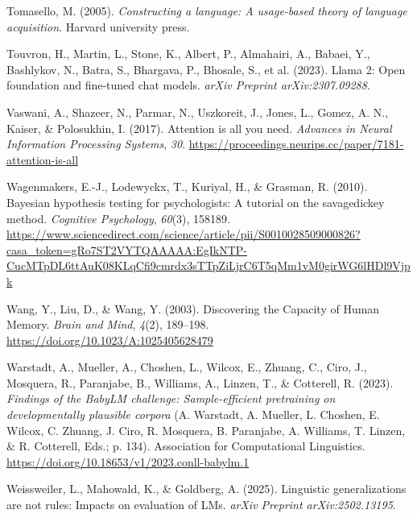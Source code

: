 \documentclass[
  12pt,
  letterpaper,
]{scrreport}
\newlength{\cslhangindent}
\newenvironment{CSLReferences}[2] %
 {\begin{list}{}{%
  \setlength{\itemindent}{0pt}
  \setlength{\leftmargin}{0pt}
  \setlength{\parsep}{0pt}
  \ifodd #1
   \setlength{\leftmargin}{\cslhangindent}
   \setlength{\itemindent}{-1\cslhangindent}
  \fi
  \setlength{\itemsep}{#2\baselineskip}}}
 {\end{list}}
\begin{document}
\begin{CSLReferences}{1}{0}
Tomasello, M. (2005). \emph{Constructing a language: A usage-based
theory of language acquisition}. Harvard university press.

Touvron, H., Martin, L., Stone, K., Albert, P., Almahairi, A., Babaei,
Y., Bashlykov, N., Batra, S., Bhargava, P., Bhosale, S., et al. (2023).
Llama 2: Open foundation and fine-tuned chat models. \emph{arXiv
Preprint arXiv:2307.09288}.

Vaswani, A., Shazeer, N., Parmar, N., Uszkoreit, J., Jones, L., Gomez,
A. N., Kaiser, \& Polosukhin, I. (2017). Attention is all you need.
\emph{Advances in Neural Information Processing Systems}, \emph{30}.
\url{https://proceedings.neurips.cc/paper/7181-attention-is-all}

Wagenmakers, E.-J., Lodewyckx, T., Kuriyal, H., \& Grasman, R. (2010).
Bayesian hypothesis testing for psychologists: A tutorial on the
savage{\textendash}dickey method. \emph{Cognitive Psychology},
\emph{60}(3), 158189.
\url{https://www.sciencedirect.com/science/article/pii/S0010028509000826?casa_token=gRo7ST2VYTQAAAAA:EgIkNTP-CucMTpDL6ttAuK08KLqCfi9cmrdx3sTTpZiLjrC6T5qMm1vM0girWG6lHDl9Vjpk}

Wang, Y., Liu, D., \& Wang, Y. (2003). Discovering the Capacity of Human
Memory. \emph{Brain and Mind}, \emph{4}(2), 189--198.
\url{https://doi.org/10.1023/A:1025405628479}

Warstadt, A., Mueller, A., Choshen, L., Wilcox, E., Zhuang, C., Ciro,
J., Mosquera, R., Paranjabe, B., Williams, A., Linzen, T., \& Cotterell,
R. (2023). \emph{Findings of the BabyLM challenge: Sample-efficient
pretraining on developmentally plausible corpora} (A. Warstadt, A.
Mueller, L. Choshen, E. Wilcox, C. Zhuang, J. Ciro, R. Mosquera, B.
Paranjabe, A. Williams, T. Linzen, \& R. Cotterell, Eds.; p. 134).
Association for Computational Linguistics.
\url{https://doi.org/10.18653/v1/2023.conll-babylm.1}

Weissweiler, L., Mahowald, K., \& Goldberg, A. (2025). Linguistic
generalizations are not rules: Impacts on evaluation of LMs. \emph{arXiv
Preprint arXiv:2502.13195}.


\end{CSLReferences}
\end{document}
